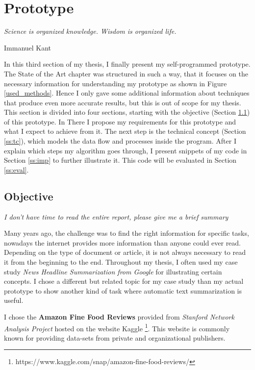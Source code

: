 \chapter{Prototype}\label{ch:proto}

\epigraph{\textit{Science is organized knowledge. Wisdom is organized life.}}{Immanuel Kant}

In this third section of my thesis, I finally present my self-programmed prototype. The State of the Art chapter was structured in such a way, that it focuses on the necessary information for understanding my prototype as shown in Figure \ref{used_methods}. Hence I only gave some additional information about techniques that produce even more accurate results, but this is out of scope for my thesis. This section is divided into four sections, starting with the objective (Section \ref{ss:obj}) of this prototype. In There I propose my requirements for this prototype and what I expect to achieve from it. The next step is the technical concept (Section \ref{ss:tc}), which models the data flow and processes inside the program. After I explain which steps my algorithm goes through, I present snippets of my code in Section \ref{ss:imp} to further illustrate it. This code will be evaluated in Section \ref{ss:eval}.

\section{Objective}\label{ss:obj}

\begin{tcolorbox}
	\begin{center}
		\textit{I don't have time to read the entire report, please give me a brief summary}
	\end{center}
\end{tcolorbox}

Many years ago, the challenge was to find the right information for specific tasks, nowadays the internet provides more information than anyone could ever read. Depending on the type of document or article, it is not always necessary to read it from the beginning to the end. Throughout my thesis, I often used my case study \textit{News Headline Summarization from Google} for illustrating certain concepts. I chose a different but related topic for my case study than my actual prototype to show another kind of task where automatic text summarization is useful.

I chose the \textbf{Amazon Fine Food Reviews} provided from \textit{Stanford Network Analysis Project} hosted on the website Kaggle \footnote{https://www.kaggle.com/snap/amazon-fine-food-reviews/}. This website is commonly known for providing data-sets from private and organizational publishers. 

